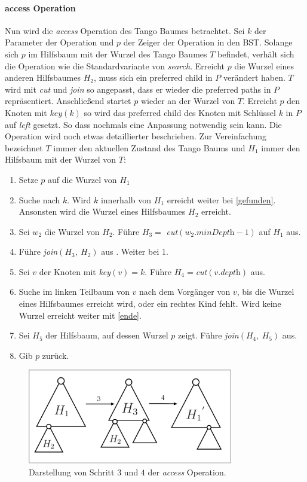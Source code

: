 \documentclass[a4paper,12pt]{article}
\begin{document}
\paragraph{access Operation}
Nun wird die \textit{access} Operation des Tango Baumes betrachtet. Sei $k$ der Parameter der Operation und $p$ der Zeiger der Operation in den BST. Solange sich $p$ im Hilfsbaum mit der Wurzel des Tango Baumes $T$ befindet, verhält sich die Operation wie die Standardvariante von \textit{search}. Erreicht $p$ die Wurzel eines anderen Hilfsbaumes $H_2$, muss sich ein preferred child in $P$ verändert haben. $T$ wird mit \textit{cut} und \textit{join} so angepasst, dass er wieder die preferred paths in $P$ repräsentiert. Anschließend startet $p$ wieder an der Wurzel von $T$. Erreicht $p$ den Knoten mit $\mathit{key}\left(k\right)$ so wird das preferred child des Knoten mit Schlüssel $k$ in $P$ auf \textit{left} gesetzt. So dass nochmals eine Anpassung notwendig sein kann. Die Operation wird noch etwas detaillierter beschrieben. Zur Vereinfachung bezeichnet $T$ immer den aktuellen Zustand des Tango Baums und $H_1$ immer den Hilfsbaum mit der Wurzel von $T$:
\begin{enumerate}
	\item Setze $p$ auf die Wurzel von $H_1$
	\item Suche nach $k$. Wird $k$ innerhalb von $H_1$ erreicht weiter bei \ref{gefunden}. Ansonsten wird die Wurzel eines Hilfsbaumes $H_2$ erreicht.
	\item Sei $w_2$ die Wurzel von $H_2$. Führe $H_3 =$ \textit{cut}$\left(w_2.\textit{minDepth} - 1\right)$ auf $H_1$ aus.
	\item Führe \textit{join}$\left(H_3, ~H_2\right)$ aus . Weiter bei 1.
	\item \label{gefunden} Sei $v$ der Knoten mit \textit{key}$\left(v\right) = k$. Führe $H_4=$\textit{cut}$ \left(v.\textit{depth}\right)$ aus. 
	\item Suche im linken Teilbaum von $v$ nach dem Vorgänger von $v$, bis die Wurzel eines Hilfsbaumes erreicht wird, oder ein rechtes Kind fehlt. Wird keine Wurzel erreicht weiter mit \ref{ende}.
	\item Sei $H_5$ der Hilfsbaum, auf dessen Wurzel $p$ zeigt. Führe \textit{join}$\left(H_4, ~H_5\right)$ aus.
	\item \label{ende} Gib $p$ zurück.
\end{enumerate}
\begin{figure}[H]
	\centering
	\includegraphics[width=0.8\textwidth]{"Medien/Tango/cutJoin"}
	\caption{Darstellung von Schritt $3$ und $4$ der \textit{access} Operation. }
	\label{fig:cutJoin}
\end{figure}
\end{document}
